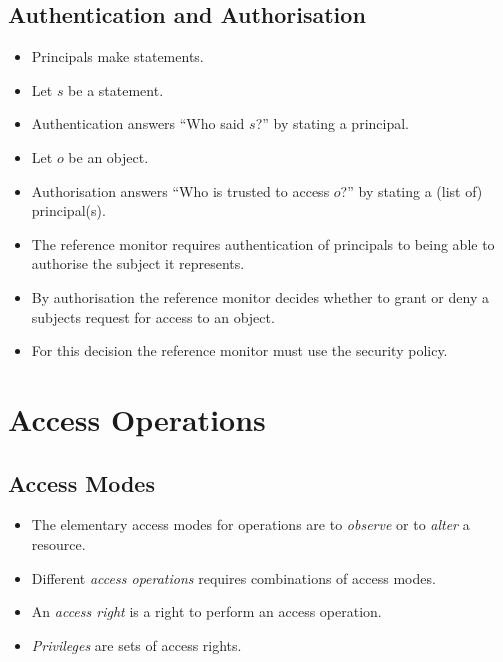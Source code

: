 \documentclass{beamer}
\begin{document}
\subsection{Authentication and Authorisation}

\begin{frame}{\insertsubsectionhead}
  \begin{itemize}
    \item Principals make statements.

    \item Let \(s\) be a statement.

    \item Authentication answers \enquote{Who said \(s\)?} by stating 
      a principal.

    \item Let \(o\) be an object.

    \item Authorisation answers \enquote{Who is trusted to access \(o\)?} by 
      stating a (list of) principal(s).

    \item The reference monitor requires authentication of principals to being 
      able to authorise the subject it represents.

    \item By authorisation the reference monitor decides whether to grant or 
      deny a subjects request for access to an object.

    \item For this decision the reference monitor must use the security policy.

  \end{itemize}
\end{frame}


\section{Access Operations}

\subsection{Access Modes}

\begin{frame}{\insertsubsectionhead}
  \begin{itemize}
    \item The elementary access modes for operations are to \emph{observe} or 
      to \emph{alter} a resource.

    \item Different \emph{access operations} requires combinations of access 
      modes.

    \item An \emph{access right} is a right to perform an access operation.

    \item \emph{Privileges} are sets of access rights.
  \end{itemize}
\end{frame}
\end{document}
